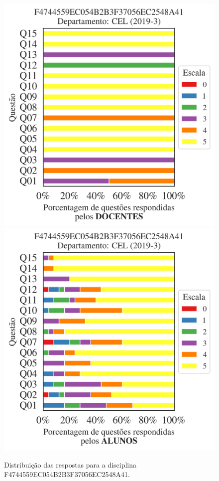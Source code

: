 \documentclass[a4paper,10pt]{article}
\begin{document}
\begin{figure}[h]
\centering
\includegraphics[width=0.485\linewidth]{analise_disciplina_departamento_CEL_F4744559EC054B2B3F37056EC2548A41_docentes.png}
\includegraphics[width=0.485\linewidth]{analise_disciplina_departamento_CEL_F4744559EC054B2B3F37056EC2548A41_alunos.png}
\caption{\label{fig:analise_geral_departamento}                Distribuição das respostas para a disciplina F4744559EC054B2B3F37056EC2548A41. }
\end{figure}
\end{document}
